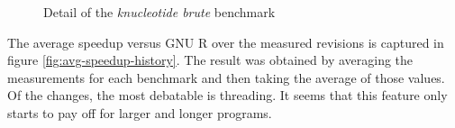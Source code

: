 
\begin{figure}[htbp]
  \caption{\label{fig:knucleotide}Detail of the \emph{knucleotide brute} benchmark}
  \centering
\end{figure}




The average speedup versus GNU R over the measured revisions is captured in figure \ref{fig:avg-speedup-history}. The result was obtained by averaging the measurements for each benchmark and then taking the average of those values. Of the changes, the most debatable is threading. It seems that this feature only starts to pay off for larger and longer programs.


